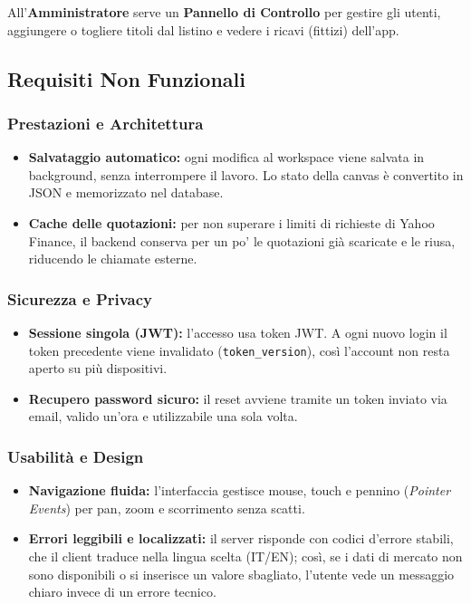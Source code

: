 All'\textbf{Amministratore} serve un \textbf{Pannello di Controllo} per gestire gli utenti, aggiungere o togliere titoli dal listino e vedere i ricavi (fittizi) dell'app.

\subsection{Requisiti Non Funzionali}

\subsubsection{Prestazioni e Architettura}
\begin{itemize}
    \item \textbf{Salvataggio automatico:} ogni modifica al workspace viene salvata in background, senza interrompere il lavoro. Lo stato della canvas è convertito in JSON e memorizzato nel database.
    \item \textbf{Cache delle quotazioni:} per non superare i limiti di richieste di Yahoo Finance, il backend conserva per un po' le quotazioni già scaricate e le riusa, riducendo le chiamate esterne.
\end{itemize}

\subsubsection{Sicurezza e Privacy}
\begin{itemize}
    \item \textbf{Sessione singola (JWT):} l'accesso usa token JWT. A ogni nuovo login il token precedente viene invalidato (\texttt{token\_version}), così l'account non resta aperto su più dispositivi.
    \item \textbf{Recupero password sicuro:} il reset avviene tramite un token inviato via email, valido un'ora e utilizzabile una sola volta.
\end{itemize}

\subsubsection{Usabilità e Design}
\begin{itemize}
    \item \textbf{Navigazione fluida:} l'interfaccia gestisce mouse, touch e pennino (\textit{Pointer Events}) per pan, zoom e scorrimento senza scatti.
    \item \textbf{Errori leggibili e localizzati:} il server risponde con codici d'errore stabili, che il client traduce nella lingua scelta (IT/EN); così, se i dati di mercato non sono disponibili o si inserisce un valore sbagliato, l'utente vede un messaggio chiaro invece di un errore tecnico.
\end{itemize}

